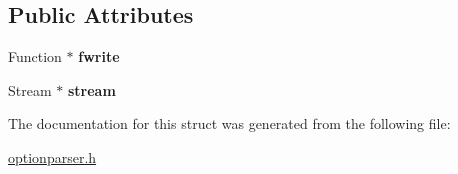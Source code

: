 \subsection*{Public Attributes}
\begin{DoxyCompactItemize}
\item 
Function $\ast$ {\bfseries fwrite}\hypertarget{structoption_1_1PrintUsageImplementation_1_1StreamWriter_a6f54abc9a3f7f00206d87a3619713954}{}\label{structoption_1_1PrintUsageImplementation_1_1StreamWriter_a6f54abc9a3f7f00206d87a3619713954}

\item 
Stream $\ast$ {\bfseries stream}\hypertarget{structoption_1_1PrintUsageImplementation_1_1StreamWriter_ab4bfd31b1c37376505ccd4230f7f7ad9}{}\label{structoption_1_1PrintUsageImplementation_1_1StreamWriter_ab4bfd31b1c37376505ccd4230f7f7ad9}

\end{DoxyCompactItemize}


The documentation for this struct was generated from the following file\+:\begin{DoxyCompactItemize}
\item 
\hyperlink{optionparser_8h}{optionparser.\+h}\end{DoxyCompactItemize}
